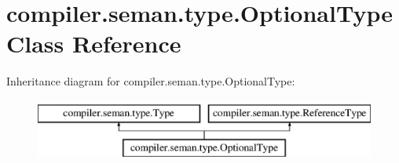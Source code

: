 \hypertarget{classcompiler_1_1seman_1_1type_1_1_optional_type}{}\section{compiler.\+seman.\+type.\+Optional\+Type Class Reference}
\label{classcompiler_1_1seman_1_1type_1_1_optional_type}
Inheritance diagram for compiler.\+seman.\+type.\+Optional\+Type\+:\begin{figure}[H]
\begin{center}
\leavevmode
\includegraphics[height=2.000000cm]{classcompiler_1_1seman_1_1type_1_1_optional_type}
\end{center}
\end{figure}
